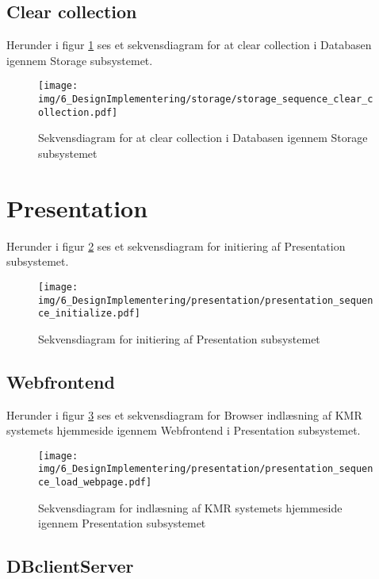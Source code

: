 \begin{appendices}
\pagebreak
\subsection{Clear collection}
Herunder i figur \ref{fig:Storage_clear_collection_sequence} ses et sekvensdiagram for at clear collection i Databasen igennem Storage subsystemet.
\begin{figure}[H]
	\centering
	\texttt{[image: img/6\_DesignImplementering/storage/storage\_sequence\_clear\_collection.pdf]}
	\caption[Sekvensdiagram for Clear collection]{Sekvensdiagram for at clear collection i Databasen igennem Storage subsystemet}
	\label{fig:Storage_clear_collection_sequence}
\end{figure}

\pagebreak
\section{Presentation}

Herunder i figur \ref{fig:presentation_init_sequence} ses et sekvensdiagram for initiering af Presentation subsystemet.
\begin{figure}[H]
	\centering
	\texttt{[image: img/6\_DesignImplementering/presentation/presentation\_sequence\_initialize.pdf]}
	\caption{Sekvensdiagram for initiering af Presentation subsystemet}
	\label{fig:presentation_init_sequence}
\end{figure}

\pagebreak

\subsection{Webfrontend}

Herunder i figur \ref{fig:presentation_webfrontend_sequence} ses et sekvensdiagram for Browser indlæsning af KMR systemets hjemmeside igennem Webfrontend i Presentation subsystemet.
\begin{figure}[H]
	\centering
	\texttt{[image: img/6\_DesignImplementering/presentation/presentation\_sequence\_load\_webpage.pdf]}
	\caption[Sekvensdiagram for Hjemmeside indlæsning]{Sekvensdiagram for indlæsning af KMR systemets hjemmeside igennem Presentation subsystemet}
	\label{fig:presentation_webfrontend_sequence}
\end{figure}

\pagebreak

\subsection{DBclientServer}


\end{appendices}
